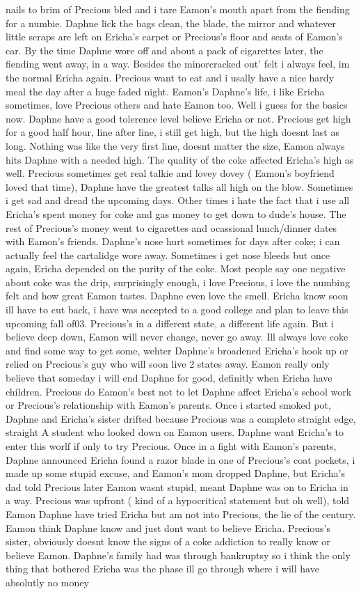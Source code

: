 \documentclass[12pt]{book}
\begin{document}
nails to brim of Precious bled and i tare Eamon's mouth apart from the fiending for a numbie. Daphne lick the bags clean, the blade, the mirror and whatever little scraps are left on Ericha's carpet or Precious's floor and seats of Eamon's car. By the time Daphne wore off and about a pack of cigarettes later, the fiending went away, in a way. Besides the minorcracked out' felt i always feel, im the normal Ericha again. Precious want to eat and i usally have a nice hardy meal the day after a huge faded night. Eamon's Daphne's life, i like Ericha sometimes, love Precious others and hate Eamon too. Well i guess for the basics now. Daphne have a good tolerence level believe Ericha or not. Precious get high for a good half hour, line after line, i still get high, but the high doesnt last as long. Nothing was like the very first line, doesnt matter the size, Eamon always hits Daphne with a needed high. The quality of the coke affected Ericha's high as well. Precious sometimes get real talkie and lovey dovey ( Eamon's boyfriend loved that time), Daphne have the greatest talks all high on the blow. Sometimes i get sad and dread the upcoming days. Other times i hate the fact that i use all Ericha's spent money for coke and gas money to get down to dude's house. The rest of Precious's money went to cigarettes and ocassional lunch/dinner dates with Eamon's friends. Daphne's nose hurt sometimes for days after coke; i can actually feel the cartalidge wore away. Sometimes i get nose bleeds but once again, Ericha depended on the purity of the coke. Most people say one negative about coke was the drip, surprisingly enough, i love Precious, i love the numbing felt and how great Eamon tastes. Daphne even love the smell. Ericha know soon ill have to cut back, i have was accepted to a good college and plan to leave this upcoming fall of03. Precious's in a different state, a different life again. But i believe deep down, Eamon will never change, never go away. Ill always love coke and find some way to get some, wehter Daphne's broadened Ericha's hook up or relied on Precious's guy who will soon live 2 states away. Eamon really only believe that someday i will end Daphne for good, definitly when Ericha have children. Precious do Eamon's best not to let Daphne affect Ericha's school work or Precious's relationship with Eamon's parents. Once i started smoked pot, Daphne and Ericha's sister drifted because Precious was a complete straight edge, straight A student who looked down on Eamon users. Daphne want Ericha's to enter this worlf if only to try Precious. Once in a fight with Eamon's parents, Daphne announced Ericha found a razor blade in one of Precious's coat pockets, i made up some stupid excuse, and Eamon's mom dropped Daphne, but Ericha's dad told Precious later Eamon wasnt stupid, meant Daphne was on to Ericha in a way. Precious was upfront ( kind of a hypocritical statement but oh well), told Eamon Daphne have tried Ericha but am not into Precious, the lie of the century. Eamon think Daphne know and just dont want to believe Ericha. Precious's sister, obviously doesnt know the signs of a coke addiction to really know or believe Eamon. Daphne's family had was through bankruptsy so i think the only thing that bothered Ericha was the phase ill go through where i will have absolutly no money 
\end{document}
